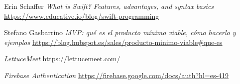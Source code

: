 
\begin{thebibliography}{9}
    Erin Schaffer
    \textit{What is Swift? Features, advantages, and syntax basics}
    \url{https://www.educative.io/blog/swift-programming}

    Stefano Gasbarrino
    \textit{MVP: qué es el producto mínimo viable, cómo hacerlo y ejemplos}
    \url{https://blog.hubspot.es/sales/producto-minimo-viable#que-es}

    \textit{LettuceMeet}
    \url{https://lettucemeet.com/}

    \textit{Firebase Authentication}
    \url{https://firebase.google.com/docs/auth?hl=es-419}

\end{thebibliography}
